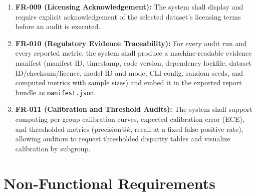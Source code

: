 \begin{enumerate}
    \item \textbf{FR-009 (Licensing Acknowledgement):} The system shall display and require explicit acknowledgement of the selected dataset's licensing terms before an audit is executed.
    \item \textbf{FR-010 (Regulatory Evidence Traceability):} For every audit run and every reported metric, the system shall produce a machine-readable evidence manifest (manifest ID, timestamp, code version, dependency lockfile, dataset ID/checksum/licence, model ID and mode, CLI config, random seeds, and computed metrics with sample sizes) and embed it in the exported report bundle as \texttt{manifest.json}.
    \item \textbf{FR-011 (Calibration and Threshold Audits):} The system shall support computing per-group calibration curves, expected calibration error (ECE), and thresholded metrics (precision@\(k\), recall at a fixed false positive rate), allowing auditors to request thresholded disparity tables and visualize calibration by subgroup.
\end{enumerate}

\section{Non-Functional Requirements}

